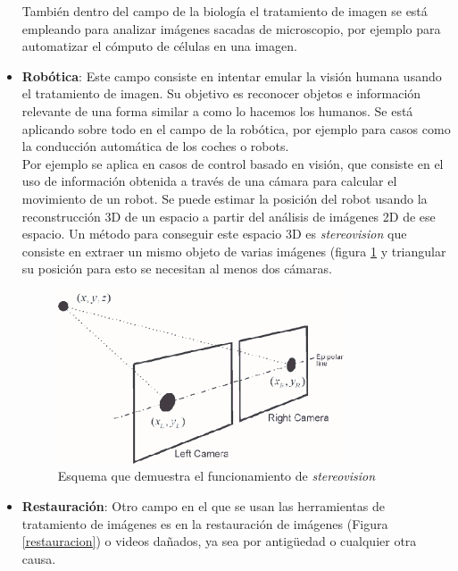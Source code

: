 \begin{itemize}
También dentro del campo de la biología el tratamiento de imagen se está empleando para analizar imágenes sacadas de microscopio, por ejemplo para automatizar el cómputo de células en una imagen.\\

\item \textbf{Robótica}: Este campo consiste en intentar emular la visión humana usando el tratamiento de imagen. Su objetivo es reconocer objetos e información relevante de una forma similar a como lo hacemos los humanos. Se está aplicando sobre todo en el campo de la robótica, por ejemplo para casos como la conducción automática de los coches o robots.\\

Por ejemplo se aplica en casos de control basado en visión, que consiste en el uso de información obtenida a través de una cámara para calcular el movimiento de un robot\cite{vision}. Se puede estimar la posición del robot usando la reconstrucción 3D de un espacio a partir del análisis de imágenes 2D de ese espacio. Un método para conseguir este espacio 3D es \emph{stereovision} que consiste en extraer un mismo objeto de varias imágenes (figura \ref{stereovision} y triangular su posición para esto se necesitan al menos dos cámaras\cite{stereovision}.

\begin{figure}[h]
\centering
\includegraphics[width=0.8\textwidth]{imagenes/stereovision.png}
\caption{Esquema que demuestra el funcionamiento de \emph{stereovision}}
\label{stereovision}
\end{figure}

\item \textbf{Restauración}: Otro campo en el que se usan las herramientas de tratamiento de imágenes es en la restauración de imágenes (Figura \ref{restauracion}) o videos dañados, ya sea por antigüedad o cualquier otra causa. \\


\end{itemize}
